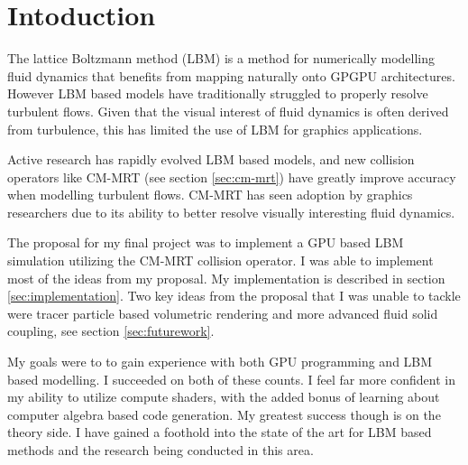 \begin{figure*}

\end{figure*}

\section{Intoduction}

The lattice Boltzmann method (LBM) 
is a method for numerically modelling fluid dynamics
that benefits from mapping naturally onto GPGPU architectures.
However LBM based models have traditionally struggled to 
properly resolve turbulent flows.
Given that the visual interest of fluid dynamics is often 
derived from turbulence, this has limited the use of LBM 
for graphics applications.

Active research has rapidly evolved LBM based models,
and new collision operators like CM-MRT (see section \ref{sec:cm-mrt})
have greatly improve accuracy when modelling turbulent flows.
CM-MRT has seen adoption by graphics 
researchers \cite{Li2020, Li2024, Lyu2021} due
to its ability to better resolve visually interesting
fluid dynamics.

The proposal for my final project was to
implement a GPU based LBM simulation utilizing the CM-MRT collision 
operator.
I was able to implement most of the ideas from
my proposal.
My implementation is described in section 
\ref{sec:implementation}.
Two key ideas from the proposal that I was unable to tackle
were tracer particle based volumetric rendering
and more advanced fluid solid coupling, see section \ref{sec:futurework}.

My goals were to to gain experience with both GPU programming and 
LBM based modelling.
I succeeded on both of these counts.
I feel far more confident in my ability to utilize compute shaders,
with the added bonus of learning about computer algebra based
code generation.
My greatest success though is on the theory side.
I have gained a foothold into
the state of the art for LBM based methods and
the research being conducted in this area.
